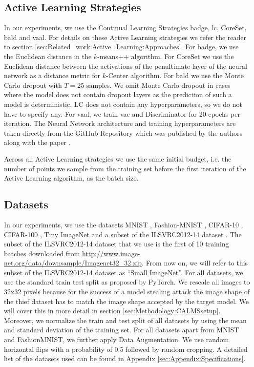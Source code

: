 \subsection{Active Learning Strategies}
\label{sec:ExperimentSetup:ALStrategies}
In our experiments, we use the Continual Learning Strategies \gls{badge}, \gls{lc}, CoreSet, \gls{bald} and \gls{vaal}. For details on these Active Learning
strategies we refer the reader to section \ref{sec:Related_work:Active_Learning:Approaches}. For \gls{badge}, we use the Euclidean distance in the $k$-means++
algorithm. For CoreSet we use the Euclidean distance between the activations of the penultimate layer of the neural network as a distance metric for $k$-Center
algorithm. For \gls{bald} we use the Monte Carlo dropout with $T=25$ samples. We omit Monte Carlo dropout in cases where the model does not contain dropout
layers as the prediction of such a model is deterministic. LC does not contain any hyperparameters, so we do not have to specify any. For \gls{vaal}, we train
\gls{vae} and Discriminator for 20 epochs per iteration. The Neural Network architecture and training hyperparameters are taken directly from the GitHub Repository
which was published by the authors along with the paper \cite{vaalRepo}. \par
Across all Active Learning strategies we use the same initial budget, i.e. the number of points we sample from the training set before the first iteration of the
Active Learning algorithm, as the batch size.

\subsection{Datasets}
\label{sec:ExperimentSetup:Datasets}
In our experiments, we use the datasets MNIST \cite{mnist_web}, Fashion-MNIST \cite{xiao2017fashion}, CIFAR-10 \cite{cifar},
CIFAR-100 \cite{cifar}, Tiny ImageNet \cite{le2015tiny} and a subset of the ILSVRC2012-14 dataset \cite{imagenet}. The subset of the ILSVRC2012-14 dataset that we
use is the first of 10 training batches downloaded from \url{http://www.image-net.org/data/downsample/Imagenet32_32.zip}. From now on, we will refer to this subset
of the ILSVRC2012-14 dataset as \enquote{Small ImageNet}. For all datasets, we use the standard train test split as proposed by PyTorch. We rescale all images to 32x32
pixels because for the success of a model stealing attack the image shape of the thief dataset has to match the image shape accepted by the target model. We will cover
this in more detail in section \ref{sec:Methodology:CALMSsetup}. Moreover, we normalize the train and test split of all datasets by using the mean and standard deviation
of the training set. For all datasets apart from MNIST and FashionMNIST, we further apply Data Augmentation. We use random horizontal flips with a probability of 0.5
followed by random cropping. A detailed list of the datasets used can be found in Appendix \ref{sec:Appendix:Specifications}. \par


